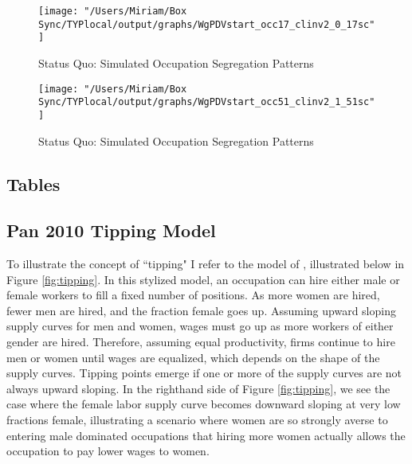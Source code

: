 \documentclass[11pt]{article}
\begin{document}
% 

\begin{figure}[H]
\centering
\caption{Status Quo: Simulated Occupation Segregation Patterns}
\label{nurses}
\texttt{[image: "/Users/Miriam/Box Sync/TYPlocal/output/graphs/WgPDVstart\_occ17\_clinv2\_0\_17sc"]}
\end{figure}
\begin{figure}[H]
\centering
\caption{Status Quo: Simulated Occupation Segregation Patterns}
\label{mechanics}
\texttt{[image: "/Users/Miriam/Box Sync/TYPlocal/output/graphs/WgPDVstart\_occ51\_clinv2\_1\_51sc"]}
\end{figure}


\newpage
\subsection{Tables}



%
%



%



%




\label{FEs}

\clearpage
\newpage

\clearpage 
\newpage
\subsection{Pan 2010 Tipping Model}\label{sec.Pan}
To illustrate the concept of ``tipping" I refer to the model of , illustrated below in Figure \ref{fig:tipping}. In this stylized model, an occupation can hire either male or female workers to fill a fixed number of positions. As more women are hired, fewer men are hired, and the fraction female goes up. Assuming upward sloping supply curves for men and women, wages must go up as more workers of either gender are hired. Therefore, assuming equal productivity, firms continue to hire men or women until wages are equalized, which depends on the shape of the supply curves. Tipping points emerge if one or more of the supply curves are not always upward sloping. In the righthand side of Figure \ref{fig:tipping}, we see the case where the female labor supply curve becomes downward sloping at very low fractions female, illustrating a scenario where women are so strongly averse to entering male dominated occupations that hiring more women actually allows the occupation to pay lower wages to women.
\end{document}
